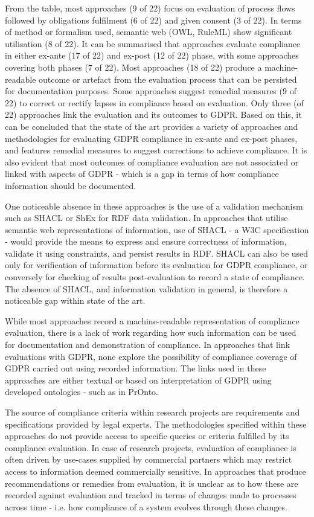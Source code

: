From the table, most approaches (9 of 22) focus on evaluation of process flows followed by obligations fulfilment (6 of 22) and given consent (3 of 22). In terms of method or formalism used, semantic web (OWL, RuleML) show significant utilisation (8 of 22). It can be summarised that approaches evaluate compliance in either ex-ante (17 of 22) and ex-post (12 of 22) phase, with some approaches covering both phases (7 of 22).
Most approaches (18 of 22) produce a machine-readable outcome or artefact from the evaluation process that can be persisted for documentation purposes. Some approaches suggest remedial measures (9 of 22) to correct or rectify lapses in compliance based on evaluation. Only three (of 22) approaches link the evaluation and its outcomes to GDPR. Based on this, it can be concluded that the state of the art provides a variety of approaches and methodologies for evaluating GDPR compliance in ex-ante and ex-post phases, and features remedial measures to suggest corrections to achieve compliance. It is also evident that most outcomes of compliance evaluation are not associated or linked with aspects of GDPR - which is a gap in terms of how compliance information should be documented.

One noticeable absence in these approaches is the use of a validation mechanism such as SHACL or ShEx for RDF data validation. In approaches that utilise semantic web representations of information, use of SHACL - a W3C specification - would provide the means to express and ensure correctness of information, validate it using constraints, and persist results in RDF. SHACL can also be used only for verification of information before its evaluation for GDPR compliance, or conversely for checking of results post-evaluation to record a state of compliance.
The absence of SHACL, and information validation in general, is therefore a noticeable gap within state of the art.

While most approaches record a machine-readable representation of compliance evaluation, there is a lack of work regarding how such information can be used for documentation and demonstration of compliance. In approaches that link evaluations with GDPR, none explore the possibility of compliance coverage of GDPR carried out using recorded information. The links used in these approaches are either textual or based on interpretation of GDPR using developed ontologies - such as in PrOnto.

The source of compliance criteria within research projects are requirements and specifications provided by legal experts. The methodologies specified within these approaches do not provide access to specific queries or criteria fulfilled by its compliance evaluation.
In case of research projects, evaluation of compliance is often driven by use-cases supplied by commercial partners which may restrict access to information deemed commercially sensitive.
In approaches that produce recommendations or remedies from evaluation, it is unclear as to how these are recorded against evaluation and tracked in terms of changes made to processes across time - i.e. how compliance of a system evolves through these changes. 

